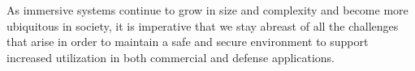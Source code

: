 

As immersive systems continue to grow in size and complexity and become more ubiquitous in society, it is imperative that we stay abreast of all the challenges that arise in order to maintain a safe and secure environment to support increased utilization in both commercial and defense applications.